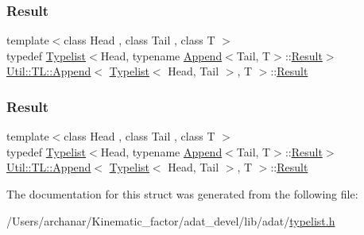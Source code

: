 \subsubsection{\texorpdfstring{Result}{Result}\hspace{0.1cm}{\footnotesize\ttfamily [1/2]}}
{\footnotesize\ttfamily template$<$class Head , class Tail , class T $>$ \\
typedef \mbox{\hyperlink{structUtil_1_1Typelist}{Typelist}}$<$Head, typename \mbox{\hyperlink{structUtil_1_1TL_1_1Append}{Append}}$<$Tail, T$>$\+::\mbox{\hyperlink{structUtil_1_1TL_1_1Append_3_01Typelist_3_01Head_00_01Tail_01_4_00_01T_01_4_ae4e9d942296ff4d7021b2482ec712082}{Result}}$>$ \mbox{\hyperlink{structUtil_1_1TL_1_1Append}{Util\+::\+T\+L\+::\+Append}}$<$ \mbox{\hyperlink{structUtil_1_1Typelist}{Typelist}}$<$ Head, Tail $>$, T $>$\+::\mbox{\hyperlink{structUtil_1_1TL_1_1Append_3_01Typelist_3_01Head_00_01Tail_01_4_00_01T_01_4_ae4e9d942296ff4d7021b2482ec712082}{Result}}}

\mbox{\label{structUtil_1_1TL_1_1Append_3_01Typelist_3_01Head_00_01Tail_01_4_00_01T_01_4_ae4e9d942296ff4d7021b2482ec712082}} 
\subsubsection{\texorpdfstring{Result}{Result}\hspace{0.1cm}{\footnotesize\ttfamily [2/2]}}
{\footnotesize\ttfamily template$<$class Head , class Tail , class T $>$ \\
typedef \mbox{\hyperlink{structUtil_1_1Typelist}{Typelist}}$<$Head, typename \mbox{\hyperlink{structUtil_1_1TL_1_1Append}{Append}}$<$Tail, T$>$\+::\mbox{\hyperlink{structUtil_1_1TL_1_1Append_3_01Typelist_3_01Head_00_01Tail_01_4_00_01T_01_4_ae4e9d942296ff4d7021b2482ec712082}{Result}}$>$ \mbox{\hyperlink{structUtil_1_1TL_1_1Append}{Util\+::\+T\+L\+::\+Append}}$<$ \mbox{\hyperlink{structUtil_1_1Typelist}{Typelist}}$<$ Head, Tail $>$, T $>$\+::\mbox{\hyperlink{structUtil_1_1TL_1_1Append_3_01Typelist_3_01Head_00_01Tail_01_4_00_01T_01_4_ae4e9d942296ff4d7021b2482ec712082}{Result}}}



The documentation for this struct was generated from the following file\+:\begin{DoxyCompactItemize}
\item 
/\+Users/archanar/\+Kinematic\+\_\+factor/adat\+\_\+devel/lib/adat/\mbox{\hyperlink{lib_2adat_2typelist_8h}{typelist.\+h}}\end{DoxyCompactItemize}

